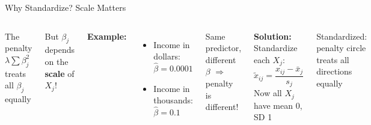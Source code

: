 \documentclass[aspectratio=169, 11pt]{beamer}
\begin{document}
\begin{frame}{Why Standardize? Scale Matters}
\begin{columns}
The penalty $\lambda \sum \beta_j^2$ treats all $\beta_j$ equally

But $\beta_j$ depends on the \textbf{scale} of $X_j$!

\vspace{0.3em}
\textbf{Example:}
\begin{itemize}
  \item Income in dollars: $\hat{\beta} = 0.0001$
  \item Income in thousands: $\hat{\beta} = 0.1$
\end{itemize}

Same predictor, different $\beta$ $\Rightarrow$ penalty is different!

\vspace{0.3em}
\textbf{Solution:} Standardize each $X_j$:
$$\tilde{x}_{ij} = \frac{x_{ij} - \bar{x}_j}{s_j}$$
Now all $X_j$ have mean 0, SD 1

\vspace{0.2em}
\footnotesize Standardized: penalty circle\\treats all directions equally
\end{columns}
\end{frame}
\end{document}
